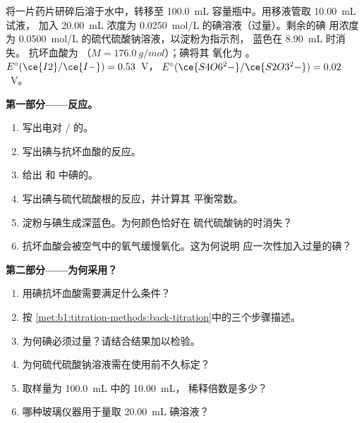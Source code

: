 \begin{problem}
\label{pb:b1:titration-methods:1}
将一片药片研碎后溶于水中，转移至 \qty{100.0}{mL}
容量瓶中。用移液管取 \qty{10.00}{mL} 试液，
加入 \qty{20.00}{mL} 浓度为 \qty{0.0250}{mol/L} 的碘溶液（过量）。剩余的碘
用浓度为 \qty{0.0500}{mol/L} 的硫代硫酸钠溶液，以淀粉为指示剂，
蓝色在 \qty{8.90}{mL} 时消失。
抗坏血酸为 （$M = \qty{176.0}{g/mol}$）；碘将其
氧化为 。$E^\circ(\ce{I2}/\ce{I-}) = 0.53$~V，
$E^\circ(\ce{S4O6^2-}/\ce{S2O3^2-}) = 0.02$~V。

\medskip
\noindent\textbf{第一部分——反应。}
\begin{enumerate}
  \item 写出电对 / 的。
  \item 写出碘与抗坏血酸的反应。
  \item 给出  和  中碘的。
  \item 写出碘与硫代硫酸根的反应，并计算其
        平衡常数。
  \item 淀粉与碘生成深蓝色。为何颜色恰好在
        硫代硫酸钠的时消失？
  \item 抗坏血酸会被空气中的氧气缓慢氧化。这为何说明
        应一次性加入过量的碘？
\end{enumerate}

\medskip
\noindent\textbf{第二部分——为何采用？}
\begin{enumerate}[resume]
  \item 用碘抗坏血酸需要满足什么条件？
  \item 按
        \cref{met:b1:titration-methods:back-titration}中的三个步骤描述。
  \item 为何碘必须过量？请结合结果加以检验。
  \item 为何硫代硫酸钠溶液需在使用前不久标定？
  \item 取样量为 \qty{100.0}{mL} 中的 \qty{10.00}{mL}，
        稀释倍数是多少？
  \item 哪种玻璃仪器用于量取 \qty{20.00}{mL} 碘溶液？
\end{enumerate}


\end{problem}
